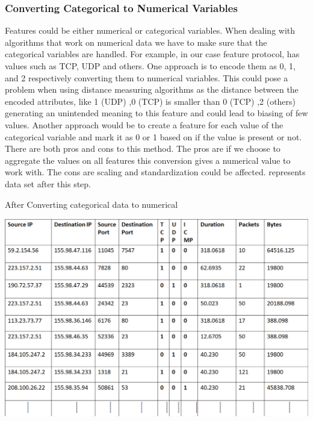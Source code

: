\subsubsection{Converting Categorical to Numerical Variables} 

Features could be either numerical or categorical variables. When dealing with algorithms that work on numerical data we have to make sure that the categorical variables are handled.
For example, in our case feature protocol, has values such as TCP, UDP and others. One approach is to encode them as 0, 1, and 2 respectively converting them to numerical variables. This could pose a problem when using distance measuring algorithms as the distance between the encoded attributes, like 1 (UDP) ,0 (TCP) is smaller than 0 (TCP) ,2 (others) generating an unintended meaning to this feature and could lead to biasing of few values. Another approach would be to create a feature for each value of the categorical variable and mark it as 0 or 1 based on if the value is present or not. There are both pros and cons to this method. The pros are if we choose to aggregate the values on all features this conversion gives a numerical value to work with. The cons are scaling and standardization could be affected.  represents data set after this step.

\begin{table}[t]
	\caption{After Converting categorical data to numerical}%
	\centerline{\includegraphics[scale = 0.6]{categorical.png}}
\end{table}

